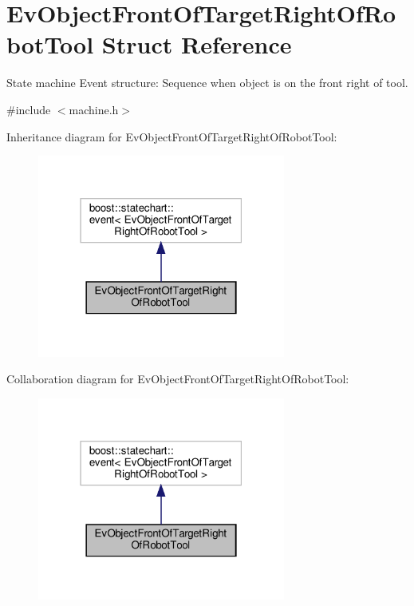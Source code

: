 \hypertarget{structEvObjectFrontOfTargetRightOfRobotTool}{}\section{Ev\+Object\+Front\+Of\+Target\+Right\+Of\+Robot\+Tool Struct Reference}
\label{structEvObjectFrontOfTargetRightOfRobotTool}


State machine Event structure\+: Sequence when object is on the front right of tool.  




{\ttfamily \#include $<$machine.\+h$>$}



Inheritance diagram for Ev\+Object\+Front\+Of\+Target\+Right\+Of\+Robot\+Tool\+:
\nopagebreak
\begin{figure}[H]
\begin{center}
\leavevmode
\includegraphics[width=231pt]{structEvObjectFrontOfTargetRightOfRobotTool__inherit__graph}
\end{center}
\end{figure}


Collaboration diagram for Ev\+Object\+Front\+Of\+Target\+Right\+Of\+Robot\+Tool\+:
\nopagebreak
\begin{figure}[H]
\begin{center}
\leavevmode
\includegraphics[width=231pt]{structEvObjectFrontOfTargetRightOfRobotTool__coll__graph}
\end{center}
\end{figure}


